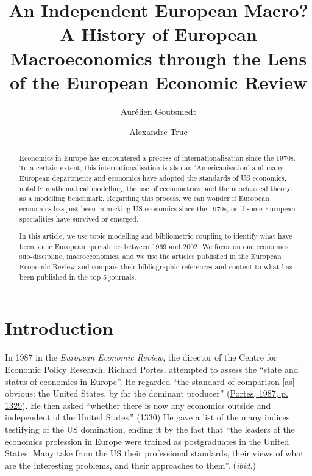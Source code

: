 \documentclass[]{elsarticle} %
\begin{document}
\begin{frontmatter}

  \title{An Independent European Macro? A History of European
Macroeconomics through the Lens of the European Economic Review}
    \author[1]{Aurélien Goutsmedt}
  
    \author[2]{Alexandre Truc}
  
      \address[1]{UCLouvain, ISPOLE. Collège Jacques Leclercq, Place
Montesquieu, 1/L 2.08.07, 1348 - Louvain-la-Neuve.}
    \address[2]{Université Côte d'Azur, CNRS GREDEG France.}
  
  \begin{abstract}
  Economics in Europe has encountered a process of internationalisation
  since the 1970s. To a certain extent, this internationalisation is
  also an `Americanisation' and many European departments and economics
  have adopted the standards of US economics, notably mathematical
  modelling, the use of econometrics, and the neoclassical theory as a
  modelling benchmark. Regarding this process, we can wonder if European
  economics has just been mimicking US economics since the 1970s, or if
  some European specialities have survived or emerged.

  In this article, we use topic modelling and bibliometric coupling to
  identify what have been some European specialities between 1969 and
  2002. We focus on one economics sub-discipline, macroeconomics, and we
  use the articles published in the European Economic Review and compare
  their bibliographic references and content to what has been published
  in the top 5 journals.
  \end{abstract}
  
 \end{frontmatter}

\hypertarget{introduction}{%
\section{Introduction}\label{introduction}}

In 1987 in the \emph{European Economic Review}, the director of the
Centre for Economic Policy Research, Richard Portes, attempted to assess
the ``state and status of economics in Europe''. He regarded ``the
standard of comparison {[}as{]} obvious: the United States, by far the
dominant producer'' (\protect\hyperlink{ref-portes1987}{Portes, 1987, p.
1329}). He then asked ``whether there is now any economics outside and
independent of the United States.'' (1330) He gave a list of the many
indices testifying of the US domination, ending it by the fact that
``the leaders of the economics profession in Europe were trained as
postgraduates in the United States. Many take from the US their
professional standards, their views of what are the interesting
problems, and their approaches to them''. (\emph{ibid.})
\end{document}
